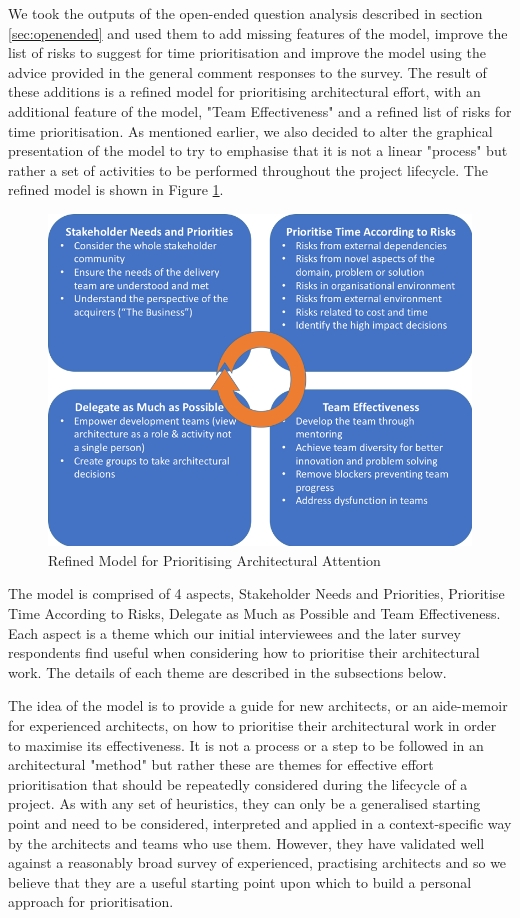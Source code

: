 We took the outputs of the open-ended question analysis described in section \ref{sec:openended} and used them to add missing features of the model, improve the list of risks to suggest for time prioritisation and improve the model using the advice provided in the general comment responses to the survey.
The result of these additions is a refined model for prioritising architectural effort, with an additional feature of the model, "Team Effectiveness" and a refined list of risks for time prioritisation.  As mentioned earlier, we also decided to alter the graphical presentation of the model to try to emphasise that it is not a linear "process" but rather a set of activities to be performed throughout the project lifecycle.  The refined model is shown in Figure \ref{figure:refinedmodel}.

\begin{figure}
\centering
\includegraphics[width=12cm]{Figures/prioritisation-refined-model}
\caption{Refined Model for Prioritising Architectural Attention}
\label{figure:refinedmodel}
\end{figure}

The model is comprised of 4 aspects, Stakeholder Needs and Priorities, Prioritise Time According to Risks, Delegate as Much as Possible and Team Effectiveness.  Each aspect is a theme which our initial interviewees and the later survey respondents find useful when considering how to prioritise their architectural work.  The details of each theme are described in the subsections below. 

The idea of the model is to provide a guide for new architects, or an aide-memoir for experienced architects, on how to prioritise their architectural work in order to maximise its effectiveness.  It is not a process or a step to be followed in an architectural "method" but rather these are themes for effective effort prioritisation that should be repeatedly considered during the lifecycle of a project.
As with any set of heuristics, they can only be a generalised starting point and need to be considered, interpreted and applied in a context-specific way by the architects and teams who use them.  However, they have validated well against a reasonably broad survey of experienced, practising architects and so we believe that they are a useful starting point upon which to build a personal approach for prioritisation.

